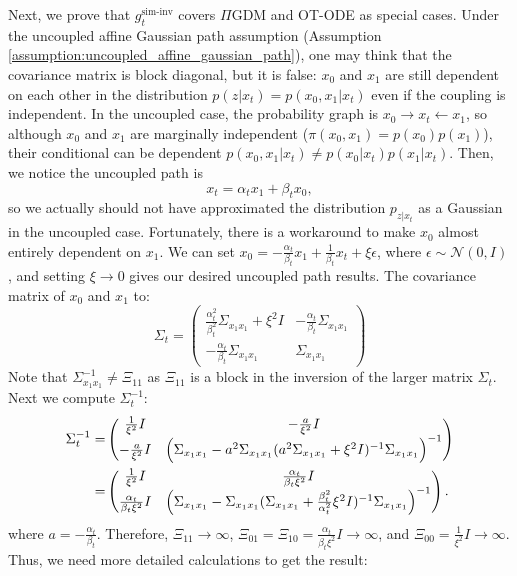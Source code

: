 Next, we prove that $g_t^{\text{sim-inv}}$ covers $\Pi$GDM \citep{song_pseudoinverse-guided_2022} and OT-ODE \citep{pokle_training-free_2024} as special cases.
Under the uncoupled affine Gaussian path assumption (Assumption \ref{assumption:uncoupled_affine_gaussian_path}), one may think that the covariance matrix is block diagonal, but it is false: $x_0$ and $x_1$ are still dependent on each other in the distribution $p(z|x_t) = p(x_0,x_1|x_t)$ even if the coupling is independent. In the uncoupled case, the probability graph is $x_0 \rightarrow x_t \leftarrow x_1$, so although $x_0$ and $x_1$ are marginally independent ($\pi(x_0,x_1)= p(x_0)p(x_1)$), their conditional can be dependent $p(x_0,x_1|x_t)\neq p(x_0|x_t)p(x_1|x_t)$.
Then, we notice the uncoupled path is 
\begin{equation}
    x_t = \alpha_t x_1 + \beta_t x_0,
\end{equation}
so we actually should not have approximated the distribution $p_{z|x_t}$ as a Gaussian in the uncoupled case. Fortunately, there is a workaround to make $x_0$ almost entirely dependent on $x_1$. We can set $x_0 = -\frac{\alpha_t}{\beta_t}x_1 + \frac{1}{\beta_t}x_t + \xi \epsilon$, where $\epsilon \sim \mathcal{N}(0, I)$, and setting $\xi \rightarrow 0$ gives our desired uncoupled path results. The covariance matrix of $x_0$ and $x_1$ to:
\begin{equation}
    \Sigma_t = \begin{pmatrix}
        \frac{\alpha_t^2}{\beta_t^2}\Sigma_{x_1 x_1} + \xi^2 I & -\frac{\alpha_t}{\beta_t} \Sigma_{x_1 x_1} \\
        -\frac{\alpha_t}{\beta_t} \Sigma_{x_1 x_1} & \Sigma_{x_1 x_1}
    \end{pmatrix}
\end{equation}
Note that $\Sigma_{x_1 x_1}^{-1} \neq \Xi_{11}$ as $\Xi_{11}$ is a block in the inversion of the larger matrix $\Sigma_t$. Next we compute $\Sigma_t^{-1}$:
\begin{align}
    \nonumber \Sigma_t^{-1} =& \begin{pmatrix}
    \frac{1}{\xi^2} I & -\frac{a}{\xi^2} I \\
    -\frac{a}{\xi^2} I  & \Big{(} \Sigma_{x_1 x_1} - a^2\Sigma_{x_1 x_1} (a^2\Sigma_{x_1 x_1} +\xi^2 I)^{-1} \Sigma_{x_1 x_1} \Big{)}^{-1}
    \end{pmatrix} \\
    = &\begin{pmatrix}
    \frac{1}{\xi^2} I & \frac{\alpha_t}{\beta_t\xi^2} I  \\
    \frac{\alpha_t}{\beta_t\xi^2} I  & \Big{(} \Sigma_{x_1 x_1} - \Sigma_{x_1 x_1} (\Sigma_{x_1 x_1} +\frac{\beta_t^2}{\alpha_t^2}\xi^2 I)^{-1} \Sigma_{x_1 x_1} \Big{)}^{-1}
    \end{pmatrix}.
\end{align}
where $a = -\frac{\alpha_t}{\beta_t}$. Therefore, $\Xi_{11} \rightarrow \infty$, $\Xi_{01}=\Xi_{10}=\frac{\alpha_t}{\beta_t\xi^2} I \rightarrow \infty$, and $\Xi_{00} = \frac{1}{\xi^2} I\rightarrow \infty $. Thus, we need more detailed calculations to get the result:

